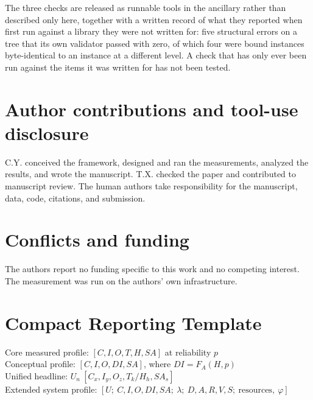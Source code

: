 \documentclass[11pt]{article}
\theoremstyle{definition}
\newcommand{\FA}{\ensuremath{F_A(H,p)}}
\begin{document}
The three checks are released as runnable tools in the ancillary  rather than described only here, together with a written record of what they reported when first run against a library they were not written for: five structural errors on a tree that its own validator passed with zero, of which four were bound instances byte-identical to an instance at a different level. A check that has only ever been run against the items it was written for has not been tested.

\section*{Author contributions and tool-use disclosure}

C.Y. conceived the framework, designed and ran the measurements, analyzed the results, and wrote the manuscript. T.X. checked the paper and contributed to manuscript review. The human authors take responsibility for the manuscript, data, code, citations, and submission.

\section*{Conflicts and funding}

The authors report no funding specific to this work and no competing interest. The measurement was run on the authors' own infrastructure.




\appendix

\section{Compact Reporting Template}

\begin{center}
Core measured profile: $[C, I, O, T, H, SA]$ at reliability $p$\\
Conceptual profile: $[C, I, O, DI, SA]$, where $DI = \FA{}$\\
Unified headline: $U_n\ [C_x, I_y, O_z, T_k/H_h, SA_s]$\\
Extended system profile: $[U;\ C,I,O,DI,SA;\ \lambda;\ D,A,R,V,S;\ \text{resources},\ \varphi]$
\end{center}
\end{document}
